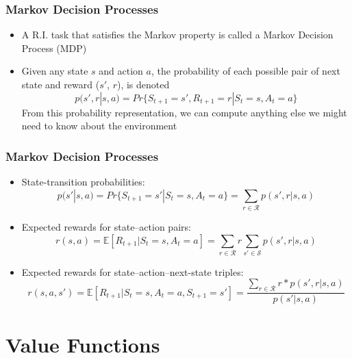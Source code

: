 \documentclass{beamer}
\begin{document}



\begin{frame}
\frametitle{Markov Decision Processes}
\begin{itemize}
\item A R.I. task that satisfies the Markov property is called a Markov Decision Process (MDP)
\item Given any state $s$ and action $a$, the probability of each possible pair of next state and reward ($s'$, $r$), is denoted
\begin{equation}
p(s',r | s,a) = Pr\{S_{t+1} = s', R_{t+1} = r | S_t = s, A_t = a\}
\nonumber
\end{equation}
From this probability representation, we can compute anything else we might need to know about the environment
\end{itemize}
\end{frame}




\begin{frame}
\frametitle{Markov Decision Processes}
\begin{itemize}
\item State-transition probabilities:
\begin{equation}
p(s' | s,a) = Pr\{S_{t+1} = s' | S_t = s, A_t = a\} =  \sum_{r \in \mathscr{R} } p(s',r | s,a)
\nonumber
\end{equation}
\item Expected rewards for state--action pairs:
\begin{equation}
r(s,a) = \mathbb{E}[R_{t+1} | S_t = s, A_t = a] = \sum_{r \in \mathscr{R} } r \sum_{s' \in \mathscr{S} } p(s',r | s,a)
\nonumber
\end{equation}
\item Expected rewards for state--action--next-state triples:
\begin{equation}
r(s,a,s') = \mathbb{E}[R_{t+1} | S_t = s, A_t = a, S_{t+1}  = s'] =  \dfrac{ \sum_{r \in \mathscr{R} } r*p(s',r | s,a)}{p(s'| s,a)}
\nonumber
\end{equation}
\end{itemize}
\end{frame}


\section{Value Functions} %
\end{document}
